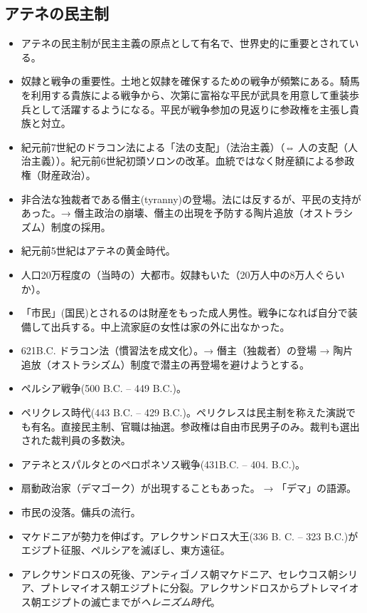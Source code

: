 \documentclass[uplatex,dvipdfmx]{jsarticle} \usepackage{mystyle}%
\begin{document}
\subsection{アテネの民主制}
\begin{itemize}
\item アテネの民主制が民主主義の原点として有名で、世界史的に重要とされている。
\item 奴隷と戦争の重要性。土地と奴隷を確保するための戦争が頻繁にある。騎馬を利用する貴族による戦争から、次第に富裕な平民が武具を用意して重装歩兵として活躍するようになる。平民が戦争参加の見返りに参政権を主張し貴族と対立。
\item 紀元前7世紀のドラコン法による「法の支配」（法治主義）（⇔ 人の支配（人治主義））。紀元前6世紀初頭ソロンの改革。血統ではなく財産額による参政権（財産政治）。
\item 非合法な独裁者である僭主(tyranny)の登場。法には反するが、平民の支持があった。→ 僭主政治の崩壊、僭主の出現を予防する陶片追放（オストラシズム）制度の採用。
\item 紀元前5世紀はアテネの黄金時代。
\item 人口20万程度の（当時の）大都市。奴隷もいた（20万人中の8万人ぐらいか）。
\item 「市民」(国民)とされるのは財産をもった成人男性。戦争になれば自分で装備して出兵する。中上流家庭の女性は家の外に出なかった。
\item 621B.C. ドラコン法（慣習法を成文化）。→ 僭主（独裁者）の登場 → 陶片追放（オストラシズム）制度で潜主の再登場を避けようとする。
\item ペルシア戦争(500 B.C. -- 449 B.C.)。
\item ペリクレス時代(443 B.C. -- 429 B.C.)。ペリクレスは民主制を称えた演説でも有名。直接民主制、官職は抽選。参政権は自由市民男子のみ。裁判も選出された裁判員の多数決。
\item アテネとスパルタとのペロポネソス戦争(431B.C. -- 404. B.C.)。
\item 扇動政治家（デマゴーク）が出現することもあった。 → 「デマ」の語源。
\item 市民の没落。傭兵の流行。
\item マケドニアが勢力を伸ばす。アレクサンドロス大王(336 B. C. -- 323 B.C.)がエジプト征服、ペルシアを滅ぼし、東方遠征。
\item アレクサンドロスの死後、アンティゴノス朝マケドニア、セレウコス朝シリア、プトレマイオス朝エジプトに分裂。アレクサンドロスからプトレマイオス朝エジプトの滅亡までが\emph{ヘレニズム時代}。
\end{itemize}
\end{document}
